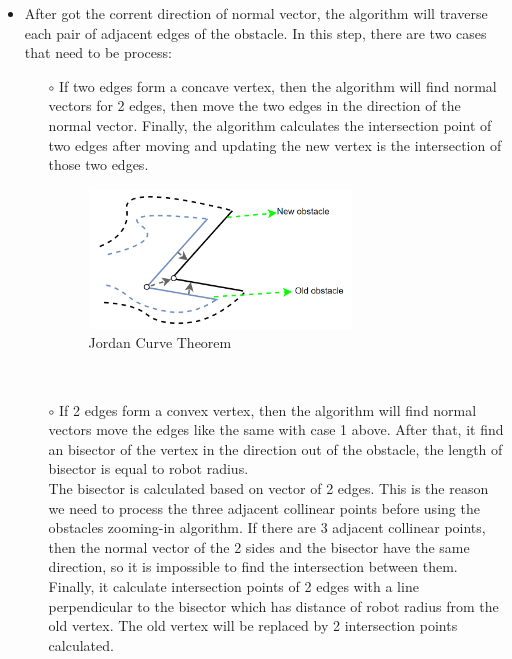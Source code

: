 \documentclass[13pt,a4paper]{article}
\begin{document}
\begin{itemize}
\begin{itemize}
					\item After got the corrent direction of normal vector, the algorithm will traverse each pair of adjacent edges of the obstacle. In this step, there are two cases that need to be process:
					\begin{itemize}
						\item[$\circ$] If two edges form a concave vertex, then the algorithm will find normal vectors for 2 edges, then move the two edges in the direction of the normal vector. Finally, the algorithm calculates the intersection point of two edges after moving and updating the new vertex is the intersection of those two edges. \\
						\begin{figure}[!h]
							\centering                                 \includegraphics[width=0.7\textwidth]{Robot_Global_Vision_Update/RGVU_fconfig_lom.png}
							\caption{Jordan Curve Theorem}
						\end{figure} \\
						\item[$\circ$] If 2 edges form a convex vertex, then the algorithm will find normal vectors move the edges like the same with case 1 above. After that, it find an bisector of the vertex in the direction out of the obstacle, the length of bisector is equal to robot radius.\\
						The bisector is calculated based on vector of 2 edges. This is the reason we need to process the three adjacent collinear points before using the obstacles zooming-in algorithm. If there are 3 adjacent collinear points, then the normal vector of the 2 sides and the bisector have the same direction, so it is impossible to find the intersection between them.\\
						Finally, it calculate intersection points of 2 edges with a line perpendicular to the bisector which has distance of robot radius from the old vertex. The old vertex will be replaced by 2 intersection points calculated.\\
						

\end{itemize}
\end{itemize}
\end{itemize}
\end{document}
